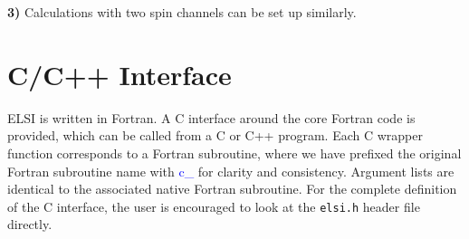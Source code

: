 \documentclass{report}
\begin{document}
\textbf{3)} Calculations with two spin channels can be set up similarly.\\

\section{C/C++ Interface}
\label{sec:c}
ELSI is written in Fortran.  A C interface around the core Fortran code is provided, which can be called from a C or C++ program.  Each C wrapper function corresponds to a Fortran subroutine, where we have prefixed the original Fortran subroutine name with \textcolor{blue}{c\_} for clarity and consistency.  Argument lists are identical to the associated native Fortran subroutine.  For the complete definition of the C interface, the user is encouraged to look at the \texttt{elsi.h} header file directly.\\
\end{document}
